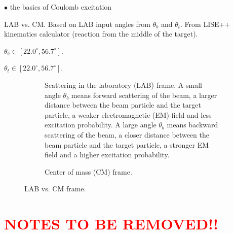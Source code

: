 \documentclass[twoside,english]{uiofysmaster/uiofysmaster}
\begin{document}
$\bullet$ the basics of Coulomb excitation 


\bigskip


\begin{table}[ht] 
    \centering 
    \caption{LAB vs. CM. Based on LAB input angles from $\theta_b$ and $\theta_t$. From LISE++ kinematics calculator (reaction from the middle of the target).}
	\label{tab:LABvsCM}
    \begin{subtable}{0.45\textwidth}
    		\centering
		\caption{$\theta_b \in [22.0^\circ, 56.7^\circ]$.}
	 	\label{tab:LABvsCM_b}
	 	
	\end{subtable}
	\begin{subtable}{0.45\textwidth}
		\centering
		\caption{$\theta_t \in [22.0^\circ, 56.7^\circ]$.}
		\label{tab:LABvsCM_t}
		
	\end{subtable}
\end{table}


\begin{figure}
	\centering
	\begin{subfigure}{\textwidth}
		
		\caption{Scattering in the laboratory (LAB) frame. A small angle $\theta_b$ means forward scattering of the beam, a larger distance between the beam particle and the target particle, a weaker electromagnetic (EM) field and less excitation probability. A large angle $\theta_b$ means backward scattering of the beam, a closer distance between the beam particle and the target particle, a stronger EM field and a higher excitation probability.}
		\label{fig:LAB}
	\end{subfigure}
	\begin{subfigure}{\textwidth}
		
		\caption{Center of mass (CM) frame.}
		\label{fig:CM}
	\end{subfigure}
	\caption{LAB vs. CM frame.}
	\label{fig:LAB-CM}
\end{figure}

\newpage

\chapter*{\textcolor{red}{NOTES TO BE REMOVED!!}}
\end{document}
